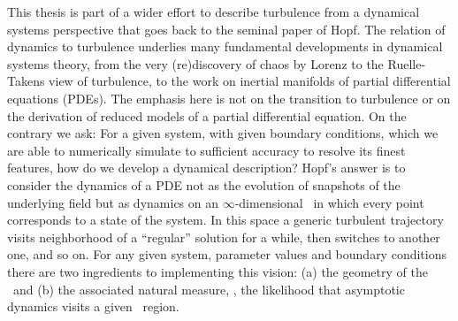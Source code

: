 


%




This thesis is part of a wider effort to describe
turbulence from a dynamical systems perspective that goes back
to the seminal paper of Hopf. The relation of
dynamics to turbulence underlies many fundamental developments
in dynamical systems theory, from the very (re)discovery of
chaos by Lorenz to the Ruelle-Takens
view of turbulence, to the work on inertial
manifolds of partial differential
equations (PDEs). The emphasis here is not on the transition to
turbulence or on the derivation of reduced models of a partial
differential equation. On the contrary we ask: For a given
system, with given boundary conditions, which we are able to
numerically simulate to sufficient accuracy
to resolve its finest features, how do we develop a dynamical
description? Hopf's answer
is to consider the dynamics of a PDE not as the evolution of
snapshots of the underlying field but as dynamics on an
$\infty$-dimensional \statesp\ in which every point
corresponds to a state of the system. In this space a generic turbulent
trajectory visits neighborhood of a ``regular'' solution for a while, then
switches to another one, and so on. For any given system,
parameter values and boundary conditions there are two
ingredients to implementing this vision: (a) the geometry of
the \statesp\ and (b) the associated natural measure, \ie, the
likelihood that asymptotic dynamics visits a given \statesp\
region.

